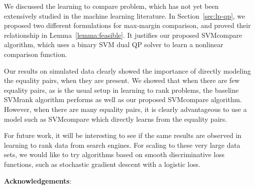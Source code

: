 \documentclass{article}
\begin{document}
We discussed the learning to compare problem, which has not yet been
extensively studied in the machine learning literature. In
Section~\ref{sec:lp-qp}, we proposed two different formulations for
max-margin comparison, and proved their relationship in
Lemma~\ref{lemma:feasible}. It justifies our proposed SVMcompare
algorithm, which uses a binary SVM dual QP solver to learn a nonlinear
comparison function.

Our results on simulated data clearly showed the importance of
directly modeling the equality pairs, when they are present. We showed
that when there are few equality pairs, as is the usual setup in
learning to rank problems, the baseline SVMrank algorithm performs as
well as our proposed SVMcompare algorithm. However, when there are
many equality pairs, it is clearly advantageous to use a model such
as SVMcompare which directly learns from the equality pairs.

For future work, it will be interesting to see if the same results are
observed in learning to rank data from search engines. For scaling to
these very large data sets, we would like to try algorithms based on
smooth discriminative loss functions, such as stochastic gradient
descent with a logistic loss.

\textbf{Acknowledgements}: 





\end{document}
